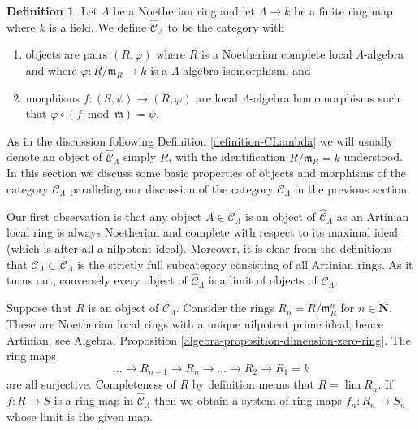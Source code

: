 \documentclass{stacks-project}
\theoremstyle{plain}
\theoremstyle{definition}
\newtheorem{definition}[subsection]{Definition}
\theoremstyle{remark}
\numberwithin{equation}{subsection}
\def\lim{\mathop{\mathrm{lim}}\nolimits}
\begin{document}
\begin{definition}
\label{definition-completion-CLambda}
Let $\Lambda$ be a Noetherian ring and let $\Lambda \to k$ be a finite
ring map where $k$ is a field. We define {\it $\widehat{\mathcal{C}}_\Lambda$}
to be the category with
\begin{enumerate}
\item objects are pairs $(R, \varphi)$ where $R$ is a Noetherian complete
local $\Lambda$-algebra and where $\varphi : R/\mathfrak m_R \to k$ is a
$\Lambda$-algebra isomorphism, and
\item morphisms $f : (S, \psi) \to (R, \varphi)$ are local $\Lambda$-algebra
homomorphisms such that $\varphi \circ (f \bmod \mathfrak m) = \psi$.
\end{enumerate}
\end{definition}

\noindent
As in the discussion following
Definition \ref{definition-CLambda}
we will usually denote an object of $\widehat{\mathcal{C}}_\Lambda$
simply $R$, with the identification $R/\mathfrak m_R = k$ understood.
In this section we discuss some basic properties of objects and morphisms
of the category $\widehat{\mathcal{C}}_\Lambda$ paralleling our discussion of
the category $\mathcal{C}_\Lambda$ in the previous section.

\medskip\noindent
Our first observation is that any object $A \in \mathcal{C}_\Lambda$
is an object of $\widehat{\mathcal{C}}_\Lambda$ as an Artinian local
ring is always Noetherian and complete with respect to its maximal ideal
(which is after all a nilpotent ideal). Moreover, it is clear from the
definitions that
$\mathcal{C}_\Lambda \subset \widehat{\mathcal{C}}_\Lambda$
is the strictly full subcategory consisting of all Artinian rings.
As it turns out, conversely every object of
$\widehat{\mathcal{C}}_\Lambda$ is a limit of objects of
$\mathcal{C}_\Lambda$.

\medskip\noindent
Suppose that $R$ is an object of $\widehat{\mathcal{C}}_\Lambda$.
Consider the rings $R_n = R/\mathfrak m_R^n$ for $n \in \mathbf{N}$.
These are Noetherian local rings with a unique nilpotent prime ideal, hence
Artinian, see
Algebra, Proposition \ref{algebra-proposition-dimension-zero-ring}.
The ring maps
$$
\ldots \to R_{n + 1} \to R_n \to \ldots \to R_2 \to R_1 = k
$$
are all surjective. Completeness of $R$ by definition means
that $R = \lim R_n$. If $f : R \to S$ is a ring map in
$\widehat{\mathcal{C}}_\Lambda$ then we obtain a system of ring maps
$f_n : R_n \to S_n$ whose limit is the given map.
\end{document}
